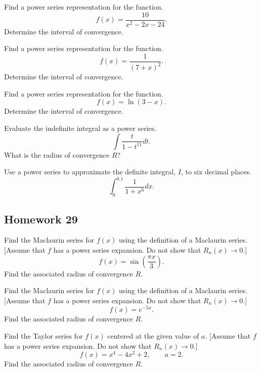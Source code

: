 \begin{problem}[WebAssign HW 28, \# 4]
Find a power series representation for the function.
\[
f(x)=\frac{10}{x^2-2x-24}.
\]
Determine the interval of convergence.
\end{problem}

\begin{problem}[WebAssign HW 28, \# 5]
Find a power series representation for the function.
\[
f(x)=\frac{1}{(7+x)^2}.
\]
Determine the interval of convergence.
\end{problem}

\begin{problem}[WebAssign HW 28, \# 6]
Find a power series representation for the function.
\[
f(x)=\ln(3-x).
\]
Determine the interval of convergence.
\end{problem}

\begin{problem}[WebAssign HW 28, \# 7]
Evaluate the indefinite integral as a power series.
\[
\int\frac{t}{1-t^{11}}dt.
\]
What is the radius of convergence $R$?
\end{problem}

\begin{problem}[WebAssign HW 28, \# 8]
Use a power series to approximate the definite integral, $I$, to six
decimal places.
\[
\int_0^{0.1}\frac{1}{1+x^6}dx.
\]
\end{problem}

\subsection{Homework 29}
\begin{problem}[WebAssign HW 29, \# 1]
Find the Maclaurin series for $f(x)$ using the definition of a Maclaurin
series. [Assume that $f$ has a power series expansion. Do not show that
$R_n(x)\to 0$.]
\[
f(x)=\sin\left(\frac{\pi x}{3}\right).
\]
Find the associated radius of convergence $R$.
\end{problem}

\begin{problem}[WebAssign HW 29, \# 2]
Find the Maclaurin series for $f(x)$ using the definition of a Maclaurin
series. [Assume that $f$ has a power series expansion. Do not show that
$R_n(x)\to 0$.]
\[
f(x)=e^{-5x}.
\]
Find the associated radius of convergence $R$.
\end{problem}

\begin{problem}[WebAssign HW 29, \# 3]
Find the Taylor series for $f(x)$ centered at the given value of
$a$. [Assume that $f$ has a power series expansion. Do not show that
$R_n(x)\to 0$.]
\[
f(x)=x^4-4x^2+2,\qquad a=2.
\]
Find the associated radius of convergence $R$.
\end{problem}

